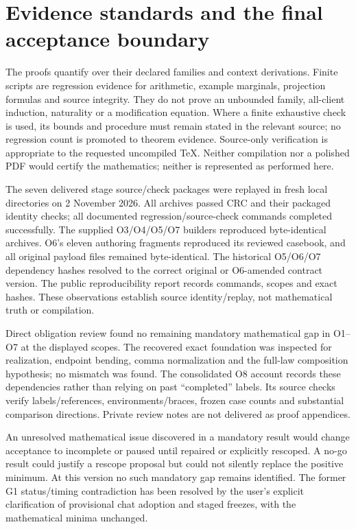 \documentclass[11pt,a4paper]{article}
\theoremstyle{definition}
\begin{document}
\section{Evidence standards and the final acceptance boundary}\label{sec:acceptance}

The proofs quantify over their declared families and context derivations.
Finite scripts are regression evidence for arithmetic, example marginals,
projection formulas and source integrity. They do not prove an unbounded
family, all-client induction, naturality or a modification equation.
Where a finite exhaustive check is used, its bounds and procedure must
remain stated in the relevant source; no regression count is promoted
to theorem evidence. Source-only verification is appropriate to the
requested uncompiled TeX. Neither compilation nor a polished PDF would
certify the mathematics; neither is represented as performed here.

The seven delivered stage source/check packages were replayed in fresh
local directories on 2 November 2026. All archives passed CRC and their
packaged identity checks; all documented regression/source-check commands
completed successfully. The supplied O3/O4/O5/O7 builders reproduced
byte-identical archives. O6's eleven authoring fragments reproduced its
reviewed casebook, and all original payload files remained byte-identical.
The historical O5/O6/O7 dependency hashes resolved to the correct original
or O6-amended contract version. The public reproducibility report records
commands, scopes and exact hashes. These observations establish source
identity/replay, not mathematical truth or compilation.

Direct obligation review found no remaining mandatory mathematical gap
in O1--O7 at the displayed scopes. The recovered exact foundation was
inspected for realization, endpoint bending, comma normalization and the
full-law composition hypothesis; no mismatch was found. The consolidated
O8 account records these dependencies rather than relying on past
``completed'' labels. Its source checks verify labels/references,
environments/braces, frozen case counts and substantial comparison
directions. Private review notes are not delivered as proof appendices.

An unresolved mathematical issue discovered in a mandatory result would
change acceptance to incomplete or paused until repaired or explicitly
rescoped. A no-go result could justify a rescope proposal but could not
silently replace the positive minimum. At this version no such mandatory
gap remains identified. The former G1 status/timing contradiction has
been resolved by the user's explicit clarification of provisional chat
adoption and staged freezes, with the mathematical minima unchanged.
\end{document}
